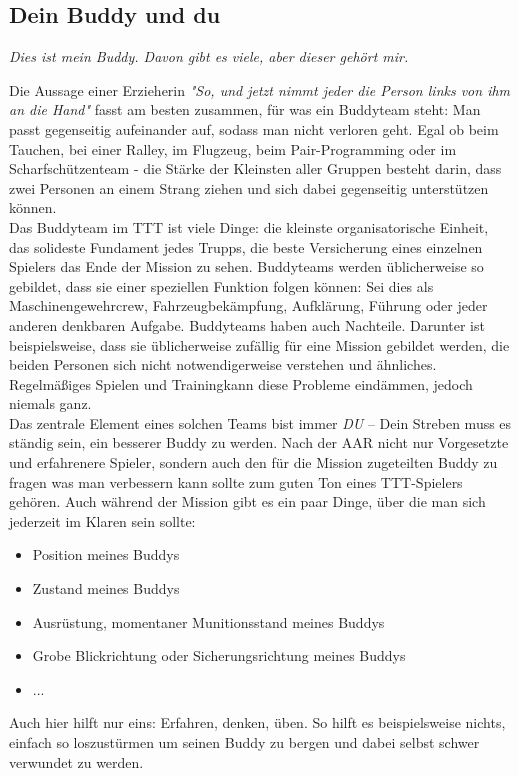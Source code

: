 \subsection{Dein Buddy und du}
\centerline{\textit{Dies ist mein Buddy. Davon gibt es viele, aber dieser gehört mir.}}
Die Aussage einer Erzieherin \textit{"So, und jetzt nimmt jeder die Person links von ihm an die Hand"} fasst am besten zusammen, für was ein Buddyteam steht: Man passt gegenseitig aufeinander auf, sodass man nicht verloren geht. Egal ob beim Tauchen, bei einer Ralley, im Flugzeug, beim Pair-Programming oder im Scharfschützenteam - die Stärke der Kleinsten aller Gruppen besteht darin, dass zwei Personen an einem Strang ziehen und sich dabei gegenseitig unterstützen können.
\\Das Buddyteam im \ac{TTT} ist viele Dinge: die kleinste organisatorische Einheit, das solideste Fundament jedes Trupps, die beste Versicherung eines einzelnen Spielers das Ende der Mission zu sehen. Buddyteams werden üblicherweise so gebildet, dass sie einer speziellen Funktion folgen können: Sei dies als Maschinengewehrcrew, Fahrzeugbekämpfung, Aufklärung, Führung oder jeder anderen denkbaren Aufgabe. Buddyteams haben auch Nachteile. Darunter ist beispielsweise, dass sie üblicherweise zufällig für eine Mission gebildet werden, die beiden Personen sich nicht notwendigerweise verstehen und ähnliches. Regelmäßiges Spielen und Trainingkann diese Probleme eindämmen, jedoch niemals ganz.
\\Das zentrale Element eines solchen Teams bist immer \textit{DU} -- Dein Streben muss es ständig sein, ein besserer Buddy zu werden. Nach der AAR nicht nur Vorgesetzte und erfahrenere Spieler, sondern auch den für die Mission zugeteilten Buddy zu fragen was man verbessern kann sollte zum guten Ton eines \ac{TTT}-Spielers gehören. Auch während der Mission gibt es ein paar Dinge, über die man sich jederzeit im Klaren sein sollte:
\begin{itemize}
	\item Position meines Buddys
	\item Zustand meines Buddys
	\item Ausrüstung, momentaner Munitionsstand meines Buddys
	\item Grobe Blickrichtung oder Sicherungsrichtung meines Buddys
	\item ...
\end{itemize}
Auch hier hilft nur eins: Erfahren, denken, üben. So hilft es beispielsweise nichts, einfach so loszustürmen um seinen Buddy zu bergen und dabei selbst schwer verwundet zu werden. 

